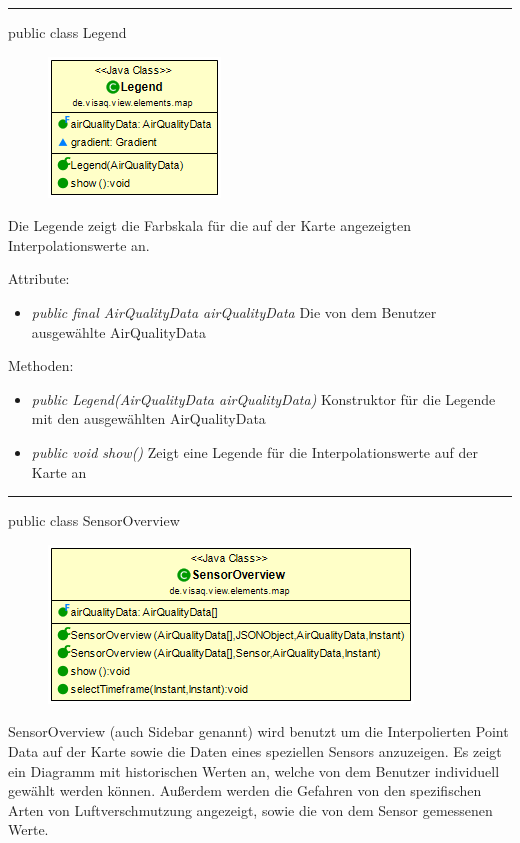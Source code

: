 
\rule{\textwidth}{0.4pt}
public class Legend

\begin{minipage}{0.3\textwidth}
    \begin{figure}[H]
        \includegraphics[scale = 0.6]{media/frontend/view/de.view.elements.map/Legend_Class.png}
    \end{figure}
    \end{minipage} \hfill
    \begin{minipage}{0.6\textwidth}
Die Legende zeigt die Farbskala für die auf der Karte angezeigten Interpolationswerte an.
\end{minipage}

Attribute:
\begin{itemize}
    \item \emph{public final AirQualityData airQualityData} Die von dem Benutzer ausgewählte AirQualityData
\end{itemize}
Methoden:
\begin{itemize}
    \item \emph{public Legend(AirQualityData airQualityData)} Konstruktor für die Legende mit den ausgewählten AirQualityData
    \item \emph{public void show()} Zeigt eine Legende für die Interpolationswerte auf der Karte an
\end{itemize}
\clearpage %
\rule{\textwidth}{0.4pt}
public class SensorOverview

\begin{minipage}{0.4\textwidth}
    \begin{figure}[H]
        \includegraphics[scale = 0.5]{media/frontend/view/de.view.elements.map/SensorOverview_Class.png}
    \end{figure}
    \end{minipage} \hfill
    \begin{minipage}{0.4\textwidth}
SensorOverview (auch Sidebar genannt) wird benutzt um die Interpolierten Point Data auf der Karte sowie die Daten eines speziellen Sensors anzuzeigen. Es zeigt ein Diagramm mit historischen Werten an, welche von dem Benutzer individuell gewählt werden können. Außerdem werden die Gefahren von den spezifischen Arten von Luftverschmutzung angezeigt, sowie die von dem Sensor gemessenen Werte.
\end{minipage}

